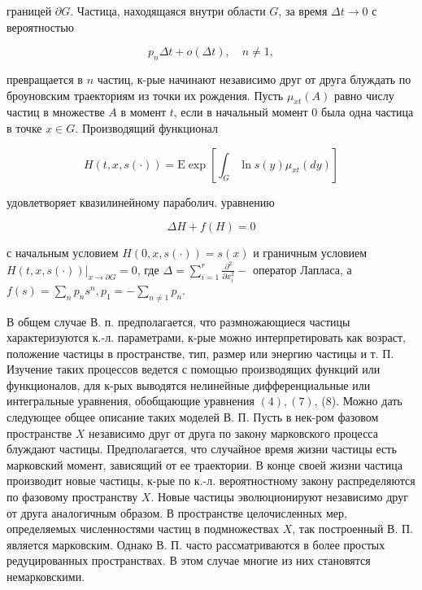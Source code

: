 \documentclass[10pt]{article}
\begin{document}
границей $\partial G$. Частица, находящаяся внутри области $G$, за время $\Delta t \rightarrow 0$ с вероятностью



\[

p_{n} \Delta t+o(\Delta t), \quad n \neq 1,

\]



превращается в $n$ частиц, к-рые начинают независимо друг от друга блуждать по броуновским траекториям из точки их рождения. Пусть $\mu_{x t}(A)$ равно числу частиц в множестве $A$ в момент $t$, если в начальный момент 0 была одна частица в точке $x \in G$. Производящий функционал



\[

H(t, x, s(\cdot))=\mathrm{E} \exp \left[\int_{G} \ln s(y) \mu_{x t}(d y)\right]

\]



удовлетворяет квазилинейному параболич. уравнению



\[

\Delta H+f(H)=0

\]



с начальным условием $H(0, x, s(\cdot))=s(x)$ и граничным условием $\left.H(t, x, s(\cdot))\right|_{x \rightarrow \partial G}=0$, где $\Delta=\sum_{i=1}^{r} \frac{\partial^{2}}{\partial x_{i}^{2}}-$ оператор Лапласа, а $f(s)=\sum_{n} p_{n} s^{n}, p_{1}=-\sum_{n \neq 1} p_{n}$.



В общем случае В. п. предполагается, что размножающиеся частицы характеризуются к.-л. параметрами, к-рые можно интерпретировать как возраст, положение частицы в пространстве, тип, размер или энергию частицы и т. П. Изучение таких процессов ведется с помощью производящих функций или функционалов, для к-рых выводятся нелинейные дифференциальные или интегральные уравнения, обобщающие уравнения $(4),(7)$, (8). Можно дать следующее общее описание таких моделей В. П. Пусть в нек-ром фазовом пространстве $X$ независимо друг от друга по закону марковского процесса блуждают частицы. Предполагается, что случайное время жизни частицы есть марковский момент, зависящий от ее траектории. В конце своей жизни частица производит новые частицы, к-рые по к.-л. вероятностному закону распределяются по фазовому пространству $X$. Новые частицы эволюционируют независимо друг от друга аналогичным образом. В пространстве целочисленных мер, определяемых численностями частиц в подмножествах $X$, так построенный В. П. является марковским. Однако В. П. часто рассматриваются в более простых редуцированных пространствах. В этом случае многие из них становятся немарковскими.
\end{document}
